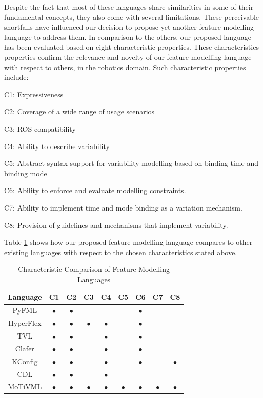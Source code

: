 \documentclass[conference]{IEEEtran}
\begin{document}
Despite the fact that most of these languages share similarities in some of their fundamental concepts, they also come with several limitations. These perceivable shortfalls have influenced our decision to propose yet another feature modelling language to address them. In comparison to the others, our proposed language has been evaluated based on eight characteristic properties. These characteristics properties confirm the relevance and novelty of our feature-modelling language with respect to others, in the robotics domain. Such characteristic properties include:
\begin{enumerate*}[label=(\roman*)]
	\item C1: Expressiveness
	\item C2: Coverage of a wide range of usage scenarios
	\item C3: ROS compatibility
	\item C4: Ability to describe variability
	\item C5: Abstract syntax support for variability modelling based on binding time and binding mode
	\item C6: Ability to enforce and evaluate modelling constraints.
	\item C7: Ability to implement time and mode binding as a variation mechanism.
	\item C8: Provision of guidelines and mechanisms that implement variability.
\end{enumerate*}

Table \ref{tab:compfml} shows how our proposed feature modelling language compares to other existing languages with respect to the chosen characteristics stated above.
\begin{table}[H]
\caption{Characteristic Comparison of Feature-Modelling Languages}
\begin{center}
\begin{tabular}{c c c c c c c c c}
\hline
    Language & C1 & C2 & C3 & C4 & C5 & C6 & C7 & C8 \\ \hline
    PyFML & $\bullet$ & $\bullet$ &  &  & & $\bullet$ & &\\\hline
    HyperFlex & $\bullet$ & $\bullet$ & $\bullet$ & $\bullet$ &  & $\bullet$ & &\\\hline
    TVL & $\bullet$ & $\bullet$ &  & $\bullet$ & & $\bullet$ & &\\ \hline
    Clafer & $\bullet$ & $\bullet$ &  & $\bullet$ &  & $\bullet$ & &\\ \hline
    KConfig & $\bullet$ & $\bullet$ & & $\bullet$ &  & $\bullet$ & & $\bullet$\\ \hline
    CDL & $\bullet$ & $\bullet$ &  &  $\bullet$ &  & & &\\ \hline
    MoTiVML & $\bullet$ & $\bullet$ & $\bullet$ & $\bullet$ & $\bullet$ & $\bullet$ & $\bullet$ & $\bullet$\\ \hline
\end{tabular}
\label{tab:compfml}
\end{center}
\end{table}
\end{document}
